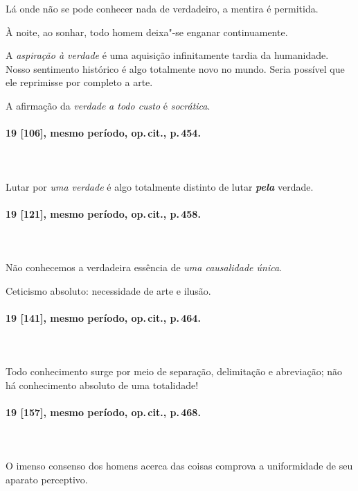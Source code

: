 Lá onde não se pode conhecer nada de verdadeiro, a mentira é permitida.

À noite, ao sonhar, todo homem deixa"-se enganar continuamente.

A \textit{aspiração à verdade} é uma aquisição infinitamente tardia da
humanidade. Nosso sentimento histórico é algo totalmente novo no mundo.
Seria possível que ele reprimisse por completo a arte. 

A afirmação da \textit{verdade} \textit{a todo custo} é
\textit{socrática}.

\pagebreak
\paragraph*{19 [106], mesmo período, op.\,cit., p.\,454.}
\ \\
\ \\

Lutar por \textit{uma verdade} é algo totalmente distinto de lutar
\textbf{\textit{pela}} verdade.

\pagebreak
\paragraph*{19 [121], mesmo período, op.\,cit., p.\,458.}
\ \\
\ \\

Não conhecemos a verdadeira essência de \textit{uma causalidade única}.

Ceticismo absoluto: necessidade de arte e ilusão.

\pagebreak
\paragraph*{19 [141], mesmo período, op.\,cit., p.\,464.}
\ \\
\ \\

Todo conhecimento surge por meio de separação, delimitação e abreviação;
não há conhecimento absoluto de uma totalidade!

\pagebreak
\paragraph*{19 [157], mesmo período, op.\,cit., p.\,468.}
\ \\
\ \\

O imenso consenso dos homens acerca das coisas comprova a uniformidade
de seu aparato perceptivo.

